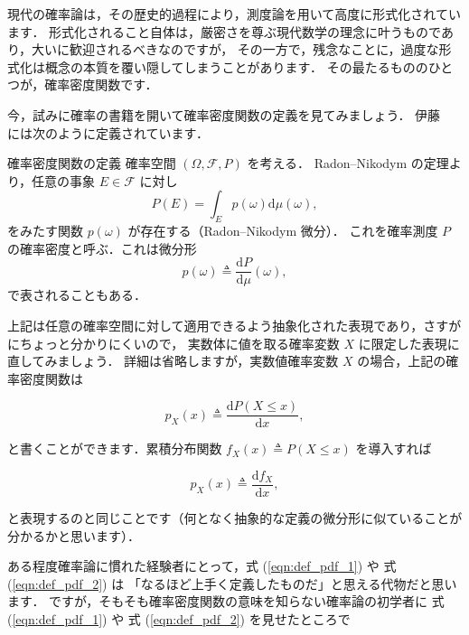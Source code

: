 

現代の確率論は，その歴史的過程により，測度論を用いて高度に形式化されています．
形式化されること自体は，厳密さを尊ぶ現代数学の理念に叶うものであり，大いに歓迎されるべきなのですが，
その一方で，残念なことに，過度な形式化は概念の本質を覆い隠してしまうことがあります．
その最たるもののひとつが，確率密度関数です．

今，試みに確率の書籍を開いて確率密度関数の定義を見てみましょう．
伊藤~\cite{Ito2004} には次のように定義されています．

\begin{theorem}{確率密度関数の定義}
    \label{thm:prob_density_func_formal}
    確率空間 $(\Omega, \mathcal{F}, P)$ を考える．
    Radon–Nikodym の定理より，任意の事象 $E \in \mathcal{F}$ に対し
    \begin{equation}
        P(E) = \int_E p(\omega) \mathrm{d} \mu(\omega),
    \end{equation}
    をみたす関数 $p(\omega)$ が存在する（Radon–Nikodym 微分）．
    これを確率測度 $P$ の確率密度と呼ぶ．これは微分形
    \begin{equation}
        p(\omega) \triangleq \frac{\mathrm{d} P}{\mathrm{d} \mu}(\omega),
    \end{equation}
    で表されることもある．
\end{theorem}

上記は任意の確率空間に対して適用できるよう抽象化された表現であり，さすがにちょっと分かりにくいので，
実数体に値を取る確率変数 $X$ に限定した表現に直してみましょう．
詳細は省略しますが，実数値確率変数 $X$ の場合，上記の確率密度関数は

\begin{equation}
    p_X(x) \triangleq \frac{\mathrm{d} P(X \leq x)}{\mathrm{d} x},
    \label{eqn:def_pdf_1}
\end{equation}

と書くことができます．累積分布関数 $f_X(x) \triangleq P(X \leq x)$ を導入すれば

\begin{equation}
    p_X(x) \triangleq \frac{\mathrm{d} f_X}{\mathrm{d} x},
    \label{eqn:def_pdf_2}
\end{equation}

と表現するのと同じことです（何となく抽象的な定義の微分形に似ていることが分かるかと思います）．

ある程度確率論に慣れた経験者にとって，式 (\ref{eqn:def_pdf_1}) や 式 (\ref{eqn:def_pdf_2}) は
「なるほど上手く定義したものだ」と思える代物だと思います．
ですが，そもそも確率密度関数の意味を知らない確率論の初学者に
式 (\ref{eqn:def_pdf_1}) や 式 (\ref{eqn:def_pdf_2}) を見せたところで

